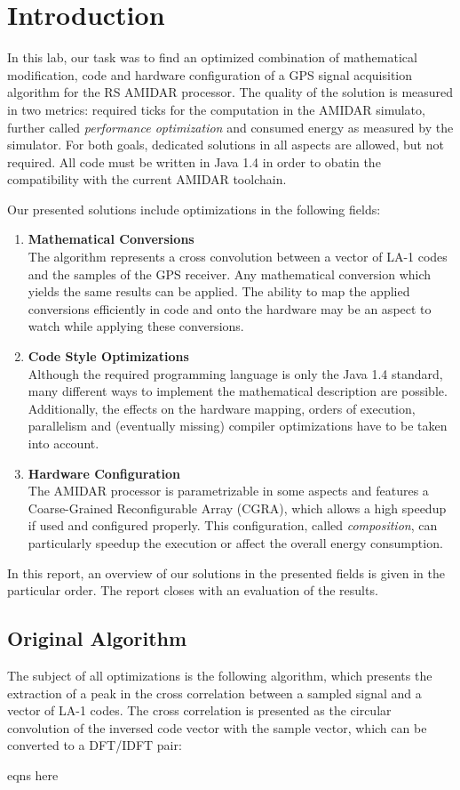 \chapter{Introduction}
\label{cha:introduction}

In this lab, our task was to find an optimized combination of mathematical modification, code and hardware configuration
of a GPS signal acquisition algorithm for the RS AMIDAR processor. The quality of the solution is measured in two metrics:
required ticks for the computation in the AMIDAR simulato, further called \emph{performance optimization} and consumed energy
as measured by the simulator. For both goals, dedicated solutions in all aspects are allowed, but not required. All code must be
written in Java 1.4 in order to obatin the compatibility with the current AMIDAR toolchain.

Our presented solutions include optimizations in the following fields:
\begin{enumerate}
    \item \textbf{Mathematical Conversions} \\ 
    The algorithm represents a cross convolution between a vector of LA-1 codes and the samples of the GPS receiver. Any mathematical 
    conversion which yields the same results can be applied. The ability to map the applied conversions efficiently in code and onto the hardware
    may be an aspect to watch while applying these conversions.\\
    \item \textbf{Code Style Optimizations}\\
    Although the required programming language is only the Java 1.4 standard, many different ways to implement the mathematical description
    are possible. Additionally, the effects on the hardware mapping, orders of execution, parallelism and (eventually missing) compiler optimizations
    have to be taken into account.\\
    \item \textbf{Hardware Configuration}\\
    The AMIDAR processor is parametrizable in some aspects and features a Coarse-Grained Reconfigurable Array (CGRA), which allows a high speedup if used and configured
    properly. This configuration, called \emph{composition}, can particularly speedup the execution or affect the overall energy consumption.
\end{enumerate}

In this report, an overview of our solutions in the presented fields is given in the particular order. The report closes with an evaluation of the results.

\section{Original Algorithm}
\label{sec:originalAlgorithm}

The subject of all optimizations is the following algorithm, which presents the extraction of a peak in the cross correlation between a sampled signal and a vector of 
LA-1 codes. The cross correlation is presented as the circular convolution of the inversed code vector with the sample vector, which can be converted to a DFT/IDFT pair:

eqns here